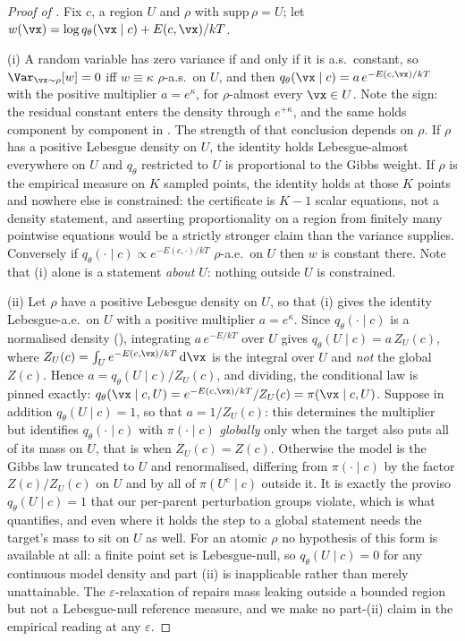 \begin{proof}[Proof of ]
Fix $c$, a region $U$ and $\rho$ with $\mathrm{supp}\,\rho = U$; let
$w(\vx) = \log q_\theta(\vx\mid c) + E(c,\vx)/kT$.

(i) A random variable has zero variance if and only if it is a.s.\ constant, so
$\Var_{\vx\sim\rho}[w] = 0$ iff $w \equiv \kappa$ $\rho$-a.s.\ on $U$, and then
$q_\theta(\vx\mid c) = a\,e^{-E(c,\vx)/kT}$ with the positive multiplier
$a = e^{\kappa}$, for $\rho$-almost every $\vx \in U$. Note the sign: the residual
constant enters the density through $e^{+\kappa}$, and the same holds component by
component in . The strength of that conclusion depends on $\rho$. If $\rho$ has a
positive Lebesgue density on $U$, the identity holds Lebesgue-almost everywhere on
$U$ and $q_\theta$ restricted to $U$ is proportional to the Gibbs weight. If
$\rho$ is the empirical measure on $K$ sampled points, the identity holds at those
$K$ points and nowhere else is constrained: the certificate is $K-1$ scalar
equations, not a density statement, and asserting proportionality on a region from
finitely many pointwise equations would be a strictly stronger claim than the
variance supplies. Conversely if $q_\theta(\cdot\mid c) \propto e^{-E(c,\cdot)/kT}$
$\rho$-a.e.\ on $U$ then $w$ is constant there. Note that (i) alone is a statement
\emph{about $U$}: nothing outside $U$ is constrained.

(ii) Let $\rho$ have a positive Lebesgue density on $U$, so that (i) gives the
identity Lebesgue-a.e.\ on $U$ with a positive multiplier $a = e^{\kappa}$. Since
$q_\theta(\cdot\mid c)$ is a normalised density (), integrating
$a\,e^{-E/kT}$ over $U$ gives $q_\theta(U \mid c) = a\,Z_U(c)$, where
$Z_U(c) = \int_U e^{-E(c,\vx)/kT}\,\mathrm{d}\vx$ is the integral over $U$ and
\emph{not} the global $Z(c)$. Hence $a = q_\theta(U\mid c)/Z_U(c)$, and dividing,
the conditional law is pinned exactly:
$q_\theta(\vx \mid c, U) = e^{-E(c,\vx)/kT}/Z_U(c) = \pi(\vx \mid c, U)$. Suppose in
addition $q_\theta(U\mid c) = 1$, so that $a = 1/Z_U(c)$: this determines the
multiplier but identifies $q_\theta(\cdot\mid c)$ with $\pi(\cdot\mid c)$
\emph{globally} only when the target also puts all of its mass on $U$, that is when
$Z_U(c) = Z(c)$. Otherwise the model is the Gibbs law truncated to $U$ and
renormalised, differing from $\pi(\cdot\mid c)$ by the factor $Z(c)/Z_U(c)$ on $U$
and by all of $\pi(U^{\mathrm{c}}\mid c)$ outside it. It is exactly the proviso
$q_\theta(U\mid c) = 1$ that our per-parent perturbation groups violate, which is
what  quantifies, and even where it holds the step to a global
statement needs the target's mass to sit on $U$ as well. For an atomic $\rho$ no
hypothesis of this form is available at all: a finite point set is Lebesgue-null,
so $q_\theta(U \mid c) = 0$ for any continuous model density and part (ii) is
inapplicable rather than merely unattainable. The $\varepsilon$-relaxation of
 repairs mass leaking outside a bounded region but not a
Lebesgue-null reference measure, and we make no part-(ii) claim in the empirical
reading at any $\varepsilon$.


\end{proof}

